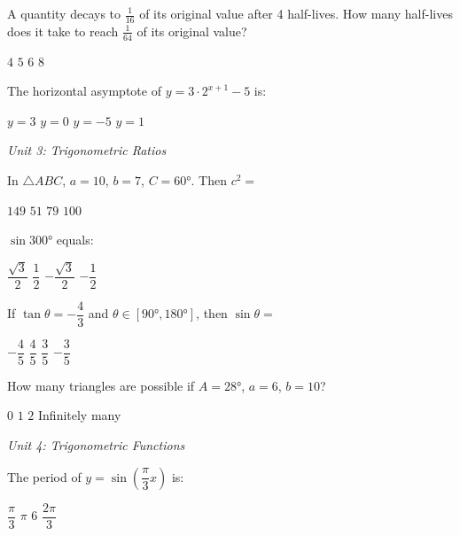\documentclass[addpoints]{exam}
\begin{document}
\begin{questions}
\question[1] A quantity decays to $\tfrac{1}{16}$ of its original value after 4
half-lives. How many half-lives does it take to reach $\tfrac{1}{64}$ of its
original value?
\begin{choices}
    \choice $4$
    \choice $5$
    \correctchoice $6$
    \choice $8$
\end{choices}

\question[1] The horizontal asymptote of $y = 3 \cdot 2^{x+1} - 5$ is:
\begin{choices}
    \choice $y = 3$
    \choice $y = 0$
    \correctchoice $y = -5$
    \choice $y = 1$
\end{choices}

\vspace{3mm}
\noindent\textit{Unit 3: Trigonometric Ratios}
\vspace{3mm}

\question[1] In $\triangle ABC$, $a = 10$, $b = 7$, $C = \ang{60}$. Then $c^2 =$
\begin{choices}
    \choice $149$
    \choice $51$
    \correctchoice $79$
    \choice $100$
\end{choices}

\question[1] $\sin\ang{300}$ equals:
\begin{choices}
    \choice $\dfrac{\sqrt{3}}{2}$
    \choice $\dfrac{1}{2}$
    \correctchoice $-\dfrac{\sqrt{3}}{2}$
    \choice $-\dfrac{1}{2}$
\end{choices}

\question[1] If $\tan\theta = -\dfrac{4}{3}$ and $\theta \in [\ang{90}, \ang{180}]$, then
$\sin\theta =$
\begin{choices}
    \choice $-\dfrac{4}{5}$
    \correctchoice $\dfrac{4}{5}$
    \choice $\dfrac{3}{5}$
    \choice $-\dfrac{3}{5}$
\end{choices}

\question[1] How many triangles are possible if $A = \ang{28}$, $a = 6$, $b = 10$?
\begin{choices}
    \choice $0$
    \choice $1$
    \correctchoice $2$
    \choice Infinitely many
\end{choices}

\vspace{3mm}
\noindent\textit{Unit 4: Trigonometric Functions}
\vspace{3mm}

\question[1] The period of $y = \sin\!\left(\dfrac{\pi}{3}x\right)$ is:
\begin{choices}
    \choice $\dfrac{\pi}{3}$
    \choice $\pi$
    \correctchoice $6$
    \choice $\dfrac{2\pi}{3}$
\end{choices}


\end{questions}
\end{document}
